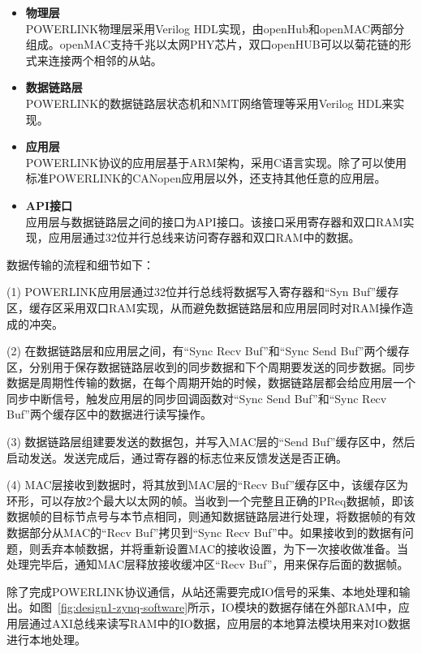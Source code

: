 \begin{itemize}

\item \textbf{物理层} \\ 
POWERLINK物理层采用Verilog HDL实现，由openHub和openMAC两部分组成。openMAC支持千兆以太网PHY芯片，双口openHUB可以以菊花链的形式来连接两个相邻的从站。 

\item \textbf{数据链路层} \\ 
POWERLINK的数据链路层状态机和NMT网络管理等采用Verilog HDL来实现。

\item \textbf{应用层} \\ 
POWERLINK协议的应用层基于ARM架构，采用C语言实现。除了可以使用标准POWERLINK的CANopen应用层以外，还支持其他任意的应用层。

\item \textbf{API接口} \\ 
应用层与数据链路层之间的接口为API接口。该接口采用寄存器和双口RAM实现，应用层通过32位并行总线来访问寄存器和双口RAM中的数据。

\end{itemize}

数据传输的流程和细节如下：

 (1) POWERLINK应用层通过32位并行总线将数据写入寄存器和“Syn Buf”缓存区，缓存区采用双口RAM实现，从而避免数据链路层和应用层同时对RAM操作造成的冲突。
 
 (2) 在数据链路层和应用层之间，有“Sync Recv Buf”和“Sync Send Buf”两个缓存区，分别用于保存数据链路层收到的同步数据和下个周期要发送的同步数据。同步数据是周期性传输的数据，在每个周期开始的时候，数据链路层都会给应用层一个同步中断信号，触发应用层的同步回调函数对“Sync Send Buf”和“Sync Recv Buf”两个缓存区中的数据进行读写操作。
 
 (3) 数据链路层组建要发送的数据包，并写入MAC层的“Send Buf”缓存区中，然后启动发送。发送完成后，通过寄存器的标志位来反馈发送是否正确。
 
 (4) MAC层接收到数据时，将其放到MAC层的“Recv Buf”缓存区中，该缓存区为环形，可以存放2个最大以太网的帧。当收到一个完整且正确的PReq数据帧，即该数据帧的目标节点号与本节点相同，则通知数据链路层进行处理，将数据帧的有效数据部分从MAC的“Recv Buf”拷贝到“Sync Recv Buf”中。如果接收到的数据有问题，则丢弃本帧数据，并将重新设置MAC的接收设置，为下一次接收做准备。当处理完毕后，通知MAC层释放接收缓冲区“Recv Buf”，用来保存后面的数据帧。

除了完成POWERLINK协议通信，从站还需要完成IO信号的采集、本地处理和输出。如图~\ref{fig:design1-zynq-software}所示，IO模块的数据存储在外部RAM中，应用层通过AXI总线来读写RAM中的IO数据，应用层的本地算法模块用来对IO数据进行本地处理。


